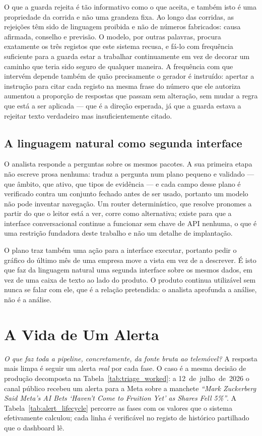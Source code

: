 O que a guarda rejeita é tão informativo como o que aceita, e também isto é uma propriedade da
corrida e não uma grandeza fixa. Ao longo das corridas, as rejeições têm sido de linguagem proibida
e não de números fabricados: causa afirmada, conselho e previsão. O modelo, por outras palavras,
procura exatamente os três registos que este sistema recusa, e fá-lo com frequência suficiente para a
guarda estar a trabalhar continuamente em vez de decorar um caminho que teria sido seguro de qualquer
maneira. A frequência com que intervém depende também de quão precisamente o gerador é instruído:
apertar a instrução para citar cada registo na mesma frase do número que ele autoriza aumentou a
proporção de respostas que passam sem alteração, sem mudar a regra que está a ser aplicada --- que é
a direção esperada, já que a guarda estava a rejeitar texto verdadeiro mas insuficientemente citado.

\subsection{A linguagem natural como segunda interface}

O analista responde a perguntas sobre os mesmos pacotes. A sua primeira etapa não escreve prosa
nenhuma: traduz a pergunta num plano pequeno e validado --- que âmbito, que ativo, que tipos de
evidência --- e cada campo desse plano é verificado contra um conjunto fechado antes de ser usado,
portanto um modelo não pode inventar navegação. Um router determinístico, que resolve pronomes a
partir do que o leitor está a ver, corre como alternativa; existe para que a interface conversacional
continue a funcionar sem chave de API nenhuma, o que é uma restrição fundadora deste trabalho e não
um detalhe de implantação.

O plano traz também uma ação para a interface executar, portanto pedir o gráfico do último mês de uma
empresa move a vista em vez de a descrever. É isto que faz da linguagem natural uma segunda interface
sobre os mesmos dados, em vez de uma caixa de texto ao lado do produto. O produto continua utilizável
sem nunca se falar com ele, que é a relação pretendida: o analista aprofunda a análise, não é a
análise.

\section{A Vida de Um Alerta}
\label{sec:investigator_lifecycle}

\emph{O que faz toda a pipeline, concretamente, da fonte bruta ao telemóvel?} A resposta mais limpa é seguir
um alerta \emph{real} por cada fase. O caso é a mesma decisão de produção decomposta na
Tabela~\ref{tab:triage_worked}: a 12~de~julho~de~2026 o canal público recebeu um alerta para a Meta sobre a
manchete \emph{``Mark Zuckerberg Said Meta's AI Bets `Haven't Come to Fruition Yet' as Shares Fell
5\%''}. A Tabela~\ref{tab:alert_lifecycle} percorre as fases com os valores que o sistema efetivamente
calculou; cada linha é verificável no registo de histórico partilhado que o dashboard lê.

